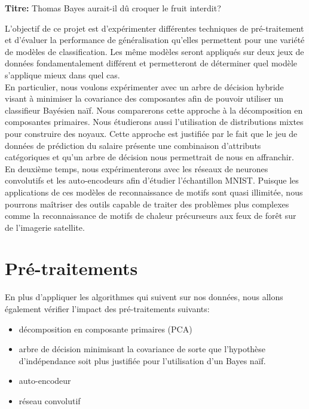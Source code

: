 \documentclass[12pt,letterpaper]{article}
\begin{document}
\textbf{Titre:} Thomas Bayes aurait-il dû croquer le fruit interdit?

\abstract

L'objectif de ce projet est d'expérimenter différentes techniques de
pré-traitement et d'évaluer la performance de généralisation qu'elles
permettent pour une variété de modèles de classification. Les même modèles
seront appliqués sur deux jeux de données fondamentalement différent et
permetteront de déterminer quel modèle s'applique mieux dans quel cas.
\\

En particulier, nous voulons expérimenter avec un arbre de décision hybride
visant à minimiser la covariance des composantes afin de pouvoir utiliser un
classifieur Bayésien naïf. Nous comparerons cette approche à la décomposition
en composantes primaires. Nous étudierons aussi l'utilisation de distributions
mixtes pour construire des noyaux. Cette approche est justifiée par le fait que
le jeu de données de prédiction du salaire présente une combinaison d'attributs
catégoriques et qu'un arbre de décision nous permettrait de nous en affranchir.
\\

En deuxième temps, nous expérimenterons avec les réseaux de neurones
convolutifs et les auto-encodeurs afin d'étudier l'échantillon MNIST. Puisque
les applications de ces modèles de reconnaissance de motifs sont quasi
illimitée, nous pourrons maîtriser des outils capable de traiter des problèmes
plus complexes comme la reconnaissance de motifs de chaleur précurseurs aux
feux de forêt sur de l'imagerie satellite.

\section{Pré-traitements}

En plus d'appliquer les algorithmes qui suivent sur nos données, nous allons
également vérifier l'impact des pré-traitements suivants:

\begin{itemize}
\item décomposition en composante primaires (PCA)
\item arbre de décision minimisant la covariance de sorte que l'hypothèse
      d'indépendance soit plus justifiée pour l'utilisation d'un Bayes naïf.
\item auto-encodeur
\item réseau convolutif
\end{itemize}
\end{document}
